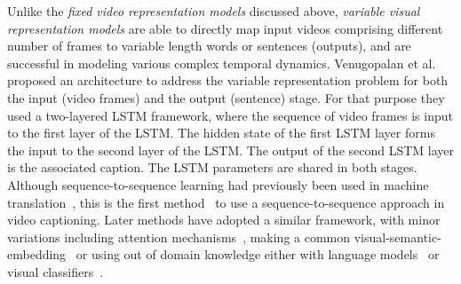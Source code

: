 \documentclass[10pt,journal,compsoc]{IEEEtran}
\begin{document}
Unlike the \textit{fixed video representation models} discussed above, \textit{variable visual representation models} are able to directly map input videos comprising different number of frames to variable length words or sentences (outputs), and are successful in modeling various complex temporal dynamics. Venugopalan et al.~\cite{venugopalan2015sequence} proposed an architecture to address the variable representation problem for both the input (video frames) and the output (sentence) stage. For that purpose they used a two-layered LSTM framework, where the sequence of video frames is input to the first layer of the LSTM. The hidden state of the first LSTM layer forms the input to the second layer of the LSTM. The output of the second LSTM layer is the associated caption. 
The LSTM parameters are shared in both stages. Although sequence-to-sequence learning had previously been used in machine translation~\cite{sutskever2014sequence}, this is the first method~\cite{venugopalan2015sequence} to use a sequence-to-sequence approach in video captioning. Later methods have adopted a similar framework, with minor variations including attention mechanisms~\cite{yao2015describing}, making a common visual-semantic-embedding~\cite{pan2016jointly} or using out of domain knowledge either with language models~\cite{venugopalan2016improving} or visual classifiers~\cite{rohrbach2015long}.
\end{document}
